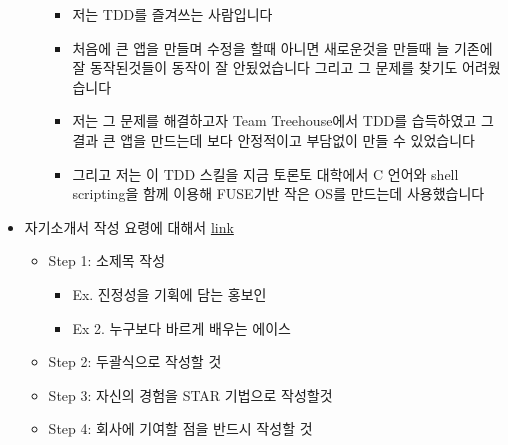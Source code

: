 \documentclass[12pt]{article}
\begin{document}
\begin{itemize}
\begin{itemize}
        \begin{itemize}
            \item 저는 TDD를 즐겨쓰는 사람입니다
            \item 처음에 큰 앱을 만들며 수정을 할때 아니면 새로운것을 만들때 늘 기존에 잘 동작된것들이 동작이 잘 안됬었습니다 그리고 그 문제를 찾기도 어려웠습니다
            \item 저는 그 문제를 해결하고자 Team Treehouse에서 TDD를 습득하였고 그 결과
            큰 앱을 만드는데 보다 안정적이고 부담없이 만들 수 있었습니다
            \item 그리고 저는 이 TDD 스킬을 지금 토론토 대학에서 C 언어와 shell scripting을 함께 이용해 FUSE기반 작은 OS를 만드는데 사용했습니다
        \end{itemize}
    \end{itemize}
    \item 자기소개서 작성 요령에 대해서 \href{https://brunch.co.kr/@hklim/11}{link}
    \begin{itemize}
        \item Step 1: 소제목 작성
        \begin{itemize}
            \item Ex. 진정성을 기휙에 담는 홍보인
            \item Ex 2. 누구보다 바르게 배우는 에이스
        \end{itemize}
        \item Step 2: 두괄식으로 작성할 것
        \item Step 3: 자신의 경험을 STAR 기법으로 작성할것
        \item Step 4: 회사에 기여할 점을 반드시 작성할 것
    \end{itemize}
\end{itemize}
\end{document}
